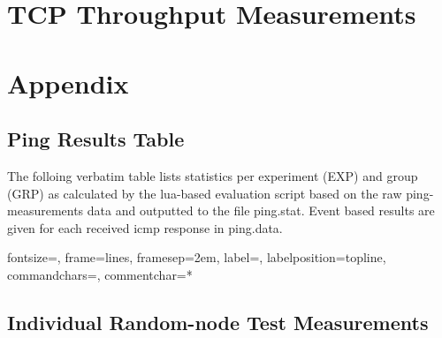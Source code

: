 \documentclass[a4paper,12pt,twoside]{article}
\begin{document}
 {%
}





\section{TCP Throughput Measurements}
\label{sec:tp-measurements}


\section{Appendix}

\subsection{Ping Results Table}

The folloing verbatim table lists statistics per experiment (EXP) and group (GRP) as calculated by the lua-based
evaluation script based on the raw ping-measurements data and outputted to the file ping.stat.
Event based results are given for each received icmp response in ping.data.

{}%
{fontsize=\tiny,
 frame=lines,  %
 framesep=2em, %
 label=,
 labelposition=topline,
 commandchars=\|\(\), %
 commentchar=*        %
}


\subsection{Individual Random-node Test Measurements}
\end{document}
